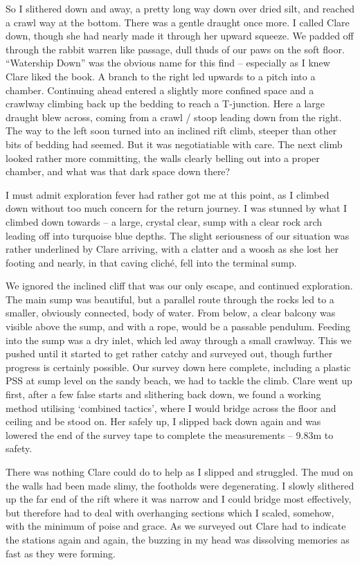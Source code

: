 So I slithered down and away, a pretty long way down over dried silt,
and reached a crawl way at the bottom. There was a gentle draught once
more. I called Clare down, though she had nearly made it through her
upward squeeze. We padded off through the rabbit warren like passage,
dull thuds of our paws on the soft floor. ``Watership Down'' was the
obvious name for this find -- especially as I knew Clare liked the book.
A branch to the right led upwards to a pitch into a chamber. Continuing
ahead entered a slightly more confined space and a crawlway climbing
back up the bedding to reach a T-junction. Here a large draught blew
across, coming from a crawl / stoop leading down from the right. The way
to the left soon turned into an inclined rift climb, steeper than other
bits of bedding had seemed. But it was negotiatiable with care. The next
climb looked rather more committing, the walls clearly belling out into
a proper chamber, and what was that dark space down there?

I must admit exploration fever had rather got me at this point, as I
climbed down without too much concern for the return journey. I was
stunned by what I climbed down towards -- a large, crystal clear, sump
with a clear rock arch leading off into turquoise blue depths. The
slight seriousness of our situation was rather underlined by Clare
arriving, with a clatter and a woosh as she lost her footing and nearly,
in that caving cliché, fell into the terminal sump.

We ignored the inclined cliff that was our only escape, and continued
exploration. The main sump was beautiful, but a parallel route through
the rocks led to a smaller, obviously connected, body of water. From
below, a clear balcony was visible above the sump, and with a rope,
would be a passable pendulum. Feeding into the sump was a dry inlet,
which led away through a small crawlway. This we pushed until it started
to get rather catchy and surveyed out, though further progress is
certainly possible. Our survey down here complete, including a plastic
PSS at sump level on the sandy beach, we had to tackle the climb. Clare
went up first, after a few false starts and slithering back down, we
found a working method utilising `combined tactics', where I would
bridge across the floor and ceiling and be stood on. Her safely up, I
slipped back down again and was lowered the end of the survey tape to
complete the measurements -- 9.83m to safety.

There was nothing Clare could do to help as I slipped and struggled. The
mud on the walls had been made slimy, the footholds were degenerating. I
slowly slithered up the far end of the rift where it was narrow and I
could bridge most effectively, but therefore had to deal with
overhanging sections which I scaled, somehow, with the minimum of poise
and grace. As we surveyed out Clare had to indicate the stations again
and again, the buzzing in my head was dissolving memories as fast as
they were forming.

